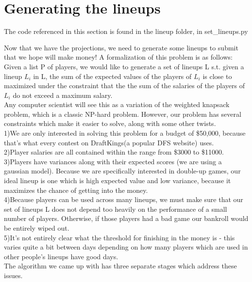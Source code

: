 \documentclass[12pt]{article}
\renewcommand{\=}[1]{\stackrel{#1}{=}} %
\theoremstyle{definition}
\begin{document}
\section{Generating the lineups} 
\label{li}
The code referenced in this section is found in the lineup folder, in set\_lineups.py 

Now that we have the projections, we need to generate some lineups to submit that we hope will make money!  A formalization of this problem is as follows: \\

Given a list P of players, we would like to generate a set of lineups L s.t. given a lineup $L_i$ in L, the sum of the expected values of the players of $L_i$ is close to maximized under the constraint that the the sum of the salaries of the players of $L_i$ do not exceed a maximum salary.  \\
 
Any computer scientist will see this as a variation of the weighted knapsack problem, which is a classic NP-hard problem.  However, our problem has several constraints which make it easier to solve, along with some other twists.\\

1)We are only interested in solving this problem for a budget of \$50,000, because that's what every contest on DraftKings(a popular DFS website) uses.  \\
2)Player salaries are all contained within the range from \$3000 to \$11000.  \\
3)Players have variances along with their expected scores (we are using a gaussian model).  Because we are specifically interested in double-up games, our ideal lineup is one which is high expected value and low variance, because it maximizes the chance of getting into the money.  \\
4)Because players can be used across many lineups, we must make sure that our set of lineups L does not depend too heavily on the performance of a small number of players.  Otherwise, if those players had a bad game our bankroll would be entirely wiped out.  \\
5)It's not entirely clear what the threshold for finishing in the money is - this varies quite a bit between days depending on how many players which are used in other people's lineups have good days.  \\

The algorithm we came up with has three separate stages which address these issues.
\end{document}
